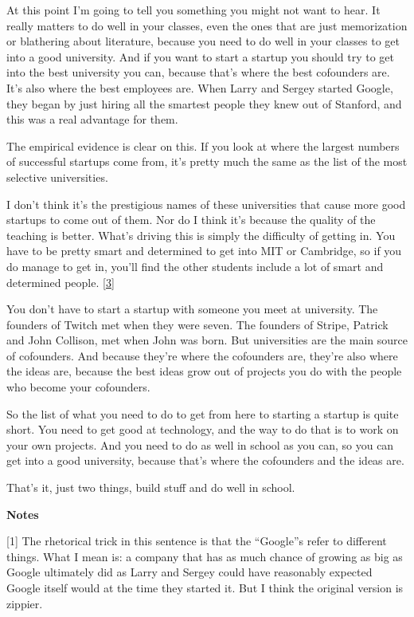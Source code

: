At this point I'm going to tell you something you might not want to
hear. It really matters to do well in your classes, even the ones that
are just memorization or blathering about literature, because you need
to do well in your classes to get into a good university. And if you
want to start a startup you should try to get into the best university
you can, because that's where the best cofounders are. It's also where
the best employees are. When Larry and Sergey started Google, they began
by just hiring all the smartest people they knew out of Stanford, and
this was a real advantage for them.

The empirical evidence is clear on this. If you look at where the
largest numbers of successful startups come from, it's pretty much the
same as the list of the most selective universities.

I don't think it's the prestigious names of these universities that
cause more good startups to come out of them. Nor do I think it's
because the quality of the teaching is better. What's driving this is
simply the difficulty of getting in. You have to be pretty smart and
determined to get into MIT or Cambridge, so if you do manage to get in,
you'll find the other students include a lot of smart and determined
people. {[}\hyperref[f3n]{3}{]}

You don't have to start a startup with someone you meet at university.
The founders of Twitch met when they were seven. The founders of Stripe,
Patrick and John Collison, met when John was born. But universities are
the main source of cofounders. And because they're where the cofounders
are, they're also where the ideas are, because the best ideas grow out
of projects you do with the people who become your cofounders.

So the list of what you need to do to get from here to starting a
startup is quite short. You need to get good at technology, and the way
to do that is to work on your own projects. And you need to do as well
in school as you can, so you can get into a good university, because
that's where the cofounders and the ideas are.

That's it, just two things, build stuff and do well in school.

\textbf{Notes}

{[}1{]} The rhetorical trick in this sentence is that the ``Google''s
refer to different things. What I mean is: a company that has as much
chance of growing as big as Google ultimately did as Larry and Sergey
could have reasonably expected Google itself would at the time they
started it. But I think the original version is zippier.

